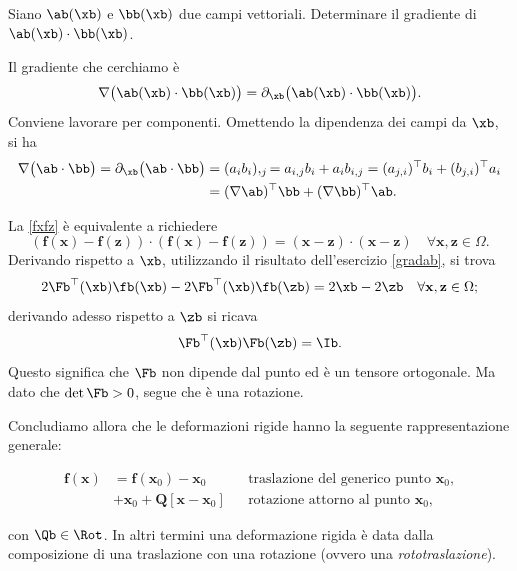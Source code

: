 \begin{exercise}\label{gradab}
Siano $\ab(\xb)$ e $\bb(\xb)$ due campi vettoriali. Determinare il gradiente di $\ab(\xb)\cdot\bb(\xb)$.

\begin{svolgimento}
Il gradiente che cerchiamo è
\begin{equation}
\nabla\big( \ab(\xb)\cdot\bb(\xb) \big)=\partial_\xb\big( \ab(\xb)\cdot\bb(\xb) \big).
\end{equation}
Conviene lavorare per componenti. Omettendo la dipendenza dei campi da $\xb$, si ha 
\begin{equation}
	\begin{aligned}
\nabla\big( \ab\cdot\bb\big)=\partial_\xb\big( \ab\cdot\bb \big)&=(a_i b_i),_{j}=a_{i,j}b_i+a_ib_{i,j}=(a_{j,i})^\top b_i+(b_{j,i})^\top a_i\\
&=(\nabla\ab)^\top\bb+(\nabla \bb)^\top\ab.
\end{aligned}
\end{equation}
\end{svolgimento}
	
\end{exercise}


La \eqref{fxfz} è equivalente a richiedere
\begin{equation}
	\left(\mathbf{f}(\mathbf{x})-\mathbf{f}(\mathbf{z})\right)\cdot\left(\mathbf{f}(\mathbf{x})-\mathbf{f}(\mathbf{z})\right)=(\mathbf{x}-\mathbf{z})\cdot(\mathbf{x}-\mathbf{z})\quad\forall\mathbf{x},\mathbf{z}\in\Omega.
\end{equation}
Derivando rispetto a $\xb$, utilizzando il risultato dell'esercizio \ref{gradab}, si trova
\begin{equation}
2	\Fb^\top(\xb)\fb(\xb)-2\Fb^\top(\xb)\fb(\zb)=2\xb-2\zb  \quad\forall\mathbf{x},\mathbf{z}\in\Omega;
\end{equation}
derivando adesso rispetto a $\zb$ si ricava
\begin{equation}
\Fb^\top(\xb)\Fb(\zb)=\Ib.
\end{equation}
Questo significa che $\Fb$ non dipende dal punto ed è un tensore ortogonale. Ma dato che $\det\Fb>0$, segue che è una rotazione.

Concludiamo allora che le deformazioni rigide hanno la seguente rappresentazione generale:
\begin{definition}
	\begin{equation}
	\begin{aligned}\mathbf{f}(\mathbf{x})&=\mathbf{f}(\mathbf{x}_0)-\mathbf{x}_0&&\text{traslazione del generico punto }\mathbf{x}_0,\\&+\mathbf{x}_0+\mathbf{Q}[\mathbf{x}-\mathbf{x}_0]&&\text{rotazione attorno al punto }\mathbf{x}_0,\end{aligned}
\end{equation}
\end{definition}
con $\Qb \in \Rot$.
In altri termini una deformazione rigida è data dalla composizione di una traslazione con una rotazione (ovvero una \textit{rototraslazione}).


